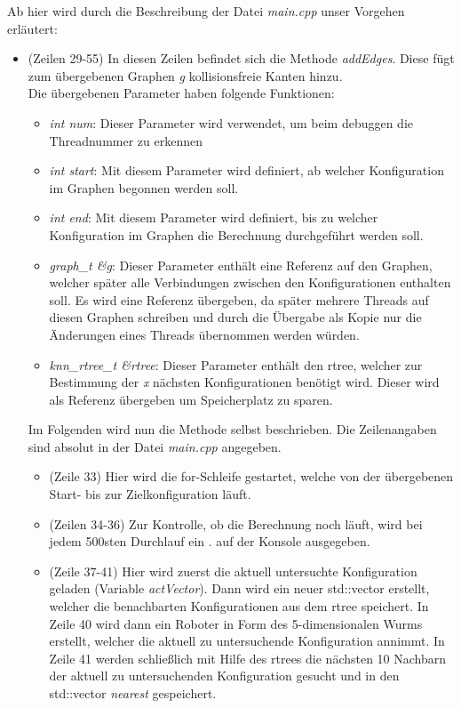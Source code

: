 \documentclass[a4paper]{scrartcl}
\begin{document}
Ab hier wird durch die Beschreibung der Datei \textit{main.cpp} unser Vorgehen erläutert:

\begin{itemize}
	\item (Zeilen 29-55) In diesen Zeilen befindet sich die Methode \textit{addEdges}. Diese fügt zum übergebenen Graphen \textit{g} kollisionsfreie Kanten hinzu.\\
	Die übergebenen Parameter haben folgende Funktionen:
	\begin{itemize}
		\item \textit{int num}: Dieser Parameter wird verwendet, um beim debuggen die Threadnummer zu erkennen
		\item \textit{int start}: Mit diesem Parameter wird definiert, ab welcher Konfiguration im Graphen begonnen werden soll.
		\item \textit{int end}: Mit diesem Parameter wird definiert, bis zu welcher Konfiguration im Graphen die Berechnung durchgeführt werden soll.
		\item \textit{graph\_t \&g}: Dieser Parameter enthält eine Referenz auf den Graphen, welcher später alle Verbindungen zwischen den Konfigurationen enthalten soll. Es wird eine Referenz übergeben, da später mehrere Threads auf diesen Graphen schreiben und durch die Übergabe als Kopie nur die Änderungen eines Threads übernommen werden würden.
		\item \textit{knn\_rtree\_t \&rtree}: Dieser Parameter enthält den rtree, welcher zur Bestimmung der \textit{x} nächsten Konfigurationen benötigt wird. Dieser wird als Referenz übergeben um Speicherplatz zu sparen.\\
	\end{itemize}
	Im Folgenden wird nun die Methode selbst beschrieben. Die Zeilenangaben sind absolut in der Datei \textit{main.cpp} angegeben.
	\begin{itemize}
		\item (Zeile 33) Hier wird die for-Schleife gestartet, welche von der übergebenen Start- bis zur Zielkonfiguration läuft.
		\item (Zeilen 34-36) Zur Kontrolle, ob die Berechnung noch läuft, wird bei jedem 500sten Durchlauf ein . auf der Konsole ausgegeben.
		\item (Zeile 37-41) Hier wird zuerst die aktuell untersuchte Konfiguration geladen (Variable \textit{actVector}). Dann wird ein neuer std::vector erstellt, welcher die benachbarten Konfigurationen aus dem rtree speichert. In Zeile 40 wird dann ein Roboter in Form des 5-dimensionalen Wurms erstellt, welcher die aktuell zu untersuchende Konfiguration annimmt. In Zeile 41 werden schließlich mit Hilfe des rtrees die nächsten 10 Nachbarn der aktuell zu untersuchenden Konfiguration gesucht und in den std::vector \textit{nearest} gespeichert. 

\end{itemize}
\end{itemize}
\end{document}
